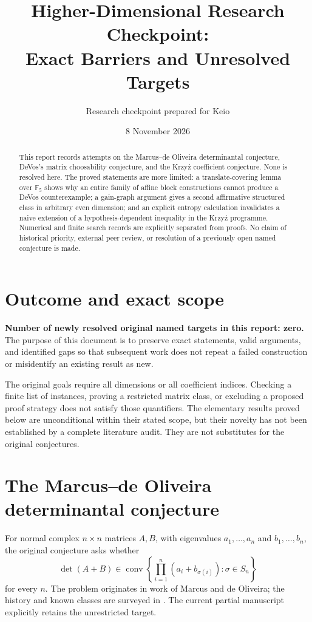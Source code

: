 \documentclass[11pt,a4paper]{article}
\title{Higher-Dimensional Research Checkpoint:\\
Exact Barriers and Unresolved Targets}
\author{Research checkpoint prepared for Keio}
\date{8 November 2026}
\newcommand{\conv}{\operatorname{conv}}
\begin{document}
\maketitle
\begin{abstract}
This report records attempts on the Marcus--de Oliveira determinantal
conjecture, DeVos's matrix choosability conjecture, and the Krzy\.{z}
coefficient conjecture. None is resolved here. The proved statements are
more limited: a translate-covering lemma over $\mathbb F_5$ shows why an
entire family of affine block constructions cannot produce a DeVos
counterexample; a gain-graph argument gives a second affirmative structured
class in arbitrary even dimension; and an explicit entropy calculation
invalidates a naive extension of a hypothesis-dependent inequality in the
Krzy\.{z} programme. Numerical and finite search records are explicitly
separated from proofs. No claim of historical priority, external peer
review, or resolution of a previously open named conjecture is made.
\end{abstract}

\section{Outcome and exact scope}

\textbf{Number of newly resolved original named targets in this report: zero.}
The purpose of this document is to preserve exact statements, valid
arguments, and identified gaps so that subsequent work does not repeat a
failed construction or misidentify an existing result as new.

The original goals require all dimensions or all coefficient indices.
Checking a finite list of instances, proving a restricted matrix class, or
excluding a proposed proof strategy does not satisfy those quantifiers.
The elementary results proved below are unconditional within their stated
scope, but their novelty has not been established by a complete literature
audit. They are not substitutes for the original conjectures.

\section{The Marcus--de Oliveira determinantal conjecture}

For normal complex $n\times n$ matrices $A,B$, with eigenvalues
$a_1,\ldots,a_n$ and $b_1,\ldots,b_n$, the original conjecture asks whether
\begin{equation}\label{eq:moc}
 \det(A+B)\in
 \conv\left\{\prod_{i=1}^n(a_i+b_{\sigma(i)}):\sigma\in S_n\right\}
\end{equation}
for every $n$. The problem originates in work of Marcus and de Oliveira;
the history and known classes are surveyed in \cite{MOCsurvey}.
The current partial manuscript \cite{Holden} explicitly retains the
unrestricted target.
\end{document}
